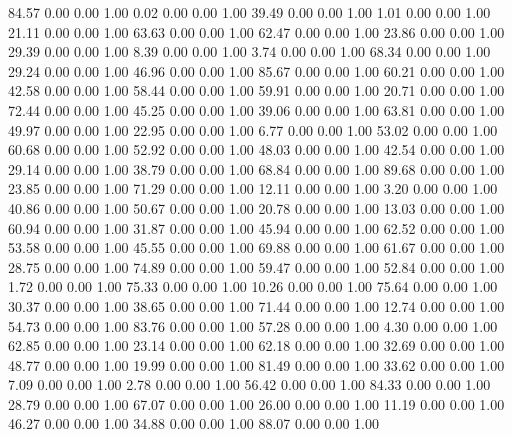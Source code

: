    84.57   0.00   0.00   1.00
    0.02   0.00   0.00   1.00
   39.49   0.00   0.00   1.00
    1.01   0.00   0.00   1.00
   21.11   0.00   0.00   1.00
   63.63   0.00   0.00   1.00
   62.47   0.00   0.00   1.00
   23.86   0.00   0.00   1.00
   29.39   0.00   0.00   1.00
    8.39   0.00   0.00   1.00
    3.74   0.00   0.00   1.00
   68.34   0.00   0.00   1.00
   29.24   0.00   0.00   1.00
   46.96   0.00   0.00   1.00
   85.67   0.00   0.00   1.00
   60.21   0.00   0.00   1.00
   42.58   0.00   0.00   1.00
   58.44   0.00   0.00   1.00
   59.91   0.00   0.00   1.00
   20.71   0.00   0.00   1.00
   72.44   0.00   0.00   1.00
   45.25   0.00   0.00   1.00
   39.06   0.00   0.00   1.00
   63.81   0.00   0.00   1.00
   49.97   0.00   0.00   1.00
   22.95   0.00   0.00   1.00
    6.77   0.00   0.00   1.00
   53.02   0.00   0.00   1.00
   60.68   0.00   0.00   1.00
   52.92   0.00   0.00   1.00
   48.03   0.00   0.00   1.00
   42.54   0.00   0.00   1.00
   29.14   0.00   0.00   1.00
   38.79   0.00   0.00   1.00
   68.84   0.00   0.00   1.00
   89.68   0.00   0.00   1.00
   23.85   0.00   0.00   1.00
   71.29   0.00   0.00   1.00
   12.11   0.00   0.00   1.00
    3.20   0.00   0.00   1.00
   40.86   0.00   0.00   1.00
   50.67   0.00   0.00   1.00
   20.78   0.00   0.00   1.00
   13.03   0.00   0.00   1.00
   60.94   0.00   0.00   1.00
   31.87   0.00   0.00   1.00
   45.94   0.00   0.00   1.00
   62.52   0.00   0.00   1.00
   53.58   0.00   0.00   1.00
   45.55   0.00   0.00   1.00
   69.88   0.00   0.00   1.00
   61.67   0.00   0.00   1.00
   28.75   0.00   0.00   1.00
   74.89   0.00   0.00   1.00
   59.47   0.00   0.00   1.00
   52.84   0.00   0.00   1.00
    1.72   0.00   0.00   1.00
   75.33   0.00   0.00   1.00
   10.26   0.00   0.00   1.00
   75.64   0.00   0.00   1.00
   30.37   0.00   0.00   1.00
   38.65   0.00   0.00   1.00
   71.44   0.00   0.00   1.00
   12.74   0.00   0.00   1.00
   54.73   0.00   0.00   1.00
   83.76   0.00   0.00   1.00
   57.28   0.00   0.00   1.00
    4.30   0.00   0.00   1.00
   62.85   0.00   0.00   1.00
   23.14   0.00   0.00   1.00
   62.18   0.00   0.00   1.00
   32.69   0.00   0.00   1.00
   48.77   0.00   0.00   1.00
   19.99   0.00   0.00   1.00
   81.49   0.00   0.00   1.00
   33.62   0.00   0.00   1.00
    7.09   0.00   0.00   1.00
    2.78   0.00   0.00   1.00
   56.42   0.00   0.00   1.00
   84.33   0.00   0.00   1.00
   28.79   0.00   0.00   1.00
   67.07   0.00   0.00   1.00
   26.00   0.00   0.00   1.00
   11.19   0.00   0.00   1.00
   46.27   0.00   0.00   1.00
   34.88   0.00   0.00   1.00
   88.07   0.00   0.00   1.00
